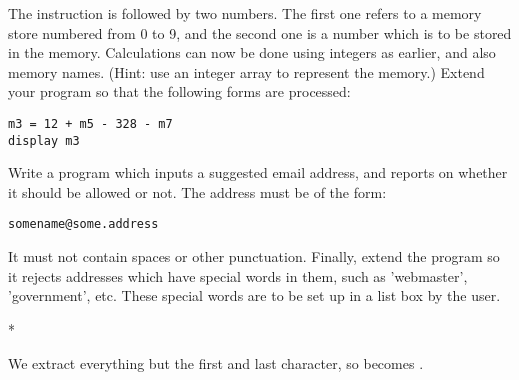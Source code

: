 \begin{EXE}
				The  instruction is followed by two numbers. The first one refers to a memory store numbered from 0 to 9, and the second one is a number which is to be stored in the memory. Calculations can now be done using integers as earlier, and also memory names. (Hint: use an integer array to represent the memory.) Extend your program so that the following forms are processed: 
				\begin{lstlisting}
m3 = 12 + m5 - 328 - m7
display m3
				\end{lstlisting}

			\item	Write a program which inputs a suggested email address, and reports on whether it should be allowed or not. The address must be of the form:
				\begin{lstlisting}
somename@some.address
				\end{lstlisting}
				It must not contain spaces or other punctuation. Finally, extend the program so it rejects addresses which have special words in them, such as 'webmaster', 'government', etc. These special words are to be set up in a list box by the user.
		\end{EXE}

		\begin{stab}*
			\begin{enumChapter}
				\item We extract everything but the first and last character, so  becomes .
			\end{enumChapter}
		\end{stab}

